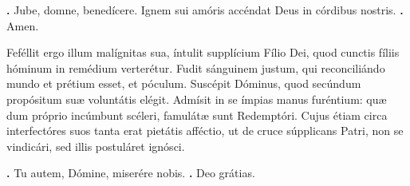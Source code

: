 \begin{small}
\textbf{\Vbar.} Jube, domne, benedícere.
Ignem sui amóris accéndat Deus in córdibus nostris. \textbf{\Rbar.} Amen.
\end{small}


Feféllit ergo illum malígnitas sua, íntulit supplícium Fílio Dei, quod cunctis fíliis hóminum in remédium verterétur. Fudit sánguinem justum, qui reconciliándo mundo et prétium esset, et póculum. Suscépit Dóminus, quod secúndum propósitum suæ voluntátis elégit. Admísit in se ímpias manus furéntium: quæ dum próprio incúmbunt scéleri, famulátæ sunt Redemptóri. Cujus étiam circa interfectóres suos tanta erat pietátis afféctio, ut de cruce súpplicans Patri, non se vindicári, sed illis postuláret ignósci.

\textbf{\Vbar.} Tu autem, Dómine, miserére nobis.
\textbf{\Rbar.} Deo grátias.



